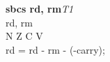 


\begin{instructionblock}{\imagewidth}%
    \textbf{sbcs rd, rm}\hfill\textit{T1}\\
    rd, rm \baseregisters\\
    {N Z C V}\\
    rd = rd - rm - (-carry);
\end{instructionblock}

